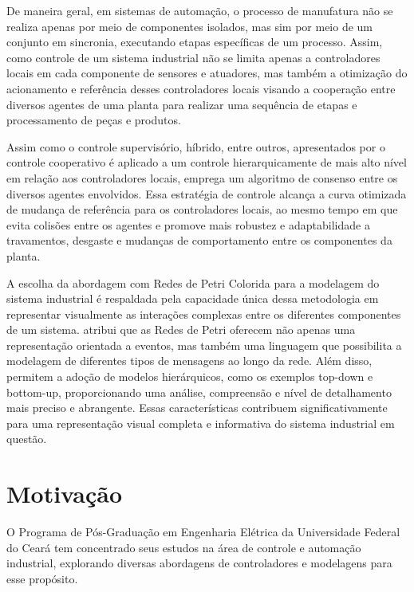 De maneira geral, em sistemas de automação, o processo de manufatura não se realiza apenas por meio de componentes isolados, mas sim por meio de um conjunto em sincronia, executando etapas específicas de um processo. Assim, como controle de um sistema industrial não se limita apenas a controladores locais em cada componente de sensores e atuadores, mas também a otimização do acionamento e referência desses controladores locais visando a cooperação entre diversos agentes de uma planta para realizar uma sequência de etapas e processamento de peças e produtos.

Assim como o controle supervisório, híbrido, entre outros, apresentados por \cite{cassandras} o controle cooperativo é aplicado a um controle hierarquicamente de mais alto nível em relação aos controladores locais, emprega um algoritmo de consenso entre os diversos agentes envolvidos. Essa estratégia de controle alcança a curva otimizada de mudança de referência para os controladores locais, ao mesmo tempo em que evita colisões entre os  agentes e promove mais robustez e adaptabilidade a travamentos, desgaste e mudanças de comportamento entre os componentes da planta.

A escolha da abordagem com Redes de Petri Colorida para a modelagem do sistema industrial é respaldada pela capacidade única dessa metodologia em representar visualmente as interações complexas entre os diferentes componentes de um sistema. \cite{jensen} atribui que as Redes de Petri oferecem não apenas uma representação orientada a eventos, mas também uma linguagem que possibilita a modelagem de diferentes tipos de mensagens ao longo da rede.  Além disso, permitem a adoção de modelos hierárquicos, como os exemplos top-down e bottom-up, proporcionando uma análise, compreensão e nível de detalhamento mais preciso e abrangente. Essas características contribuem significativamente para uma representação visual completa e informativa do sistema industrial em questão.

 \section{Motivação}
O Programa de Pós-Graduação em Engenharia Elétrica da Universidade Federal do Ceará tem concentrado seus estudos na área de controle e automação industrial, explorando diversas abordagens de controladores e modelagens para esse propósito.

